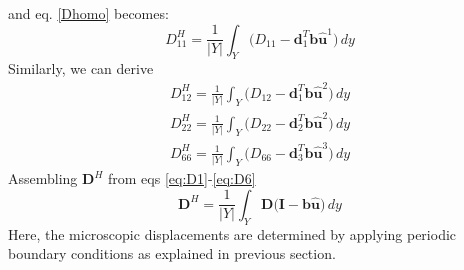 \documentclass[10pt]{article}
\newcommand{\e}[1]{\textbf{#1}}
\begin{document}
and eq. \eqref{Dhomo} becomes:
\begin{equation}
\label{eq:D1}
\boxed{D^H_{11} = \frac{1}{|Y|}\int_Y\bigg (D_{11}-\textbf{d}_1^T\textbf{b}\hat{\e u}^1\bigg )\,dy
}
\end{equation}
Similarly, we can derive
\begin{eqnarray}
D^H_{12} = \frac{1}{|Y|}\int_Y\bigg (D_{12}-\textbf{d}_1^T\textbf{b}\hat{\e u}^2\bigg )\,dy\\
D^H_{22} = \frac{1}{|Y|}\int_Y\bigg (D_{22}-\textbf{d}_2^T\textbf{b}\hat{\e u}^2\bigg )\,dy\\
\label{eq:D6}
D^H_{66} = \frac{1}{|Y|}\int_Y\bigg (D_{66}-\textbf{d}_3^T\textbf{b}\hat{\e u}^3\bigg )\,dy
\end{eqnarray}
Assembling $\e D^H$ from eqs \eqref{eq:D1}-\eqref{eq:D6}
\begin{equation}
\label{eq:dehomogenized2}
\boxed{\e D^H = \frac{1}{|Y|}\int_Y\e D\big (\e I-\textbf{b}\hat{\e u}\big)\,dy}
\end{equation}
Here, the microscopic displacements are determined by applying periodic boundary conditions as explained in previous section.
\end{document}
